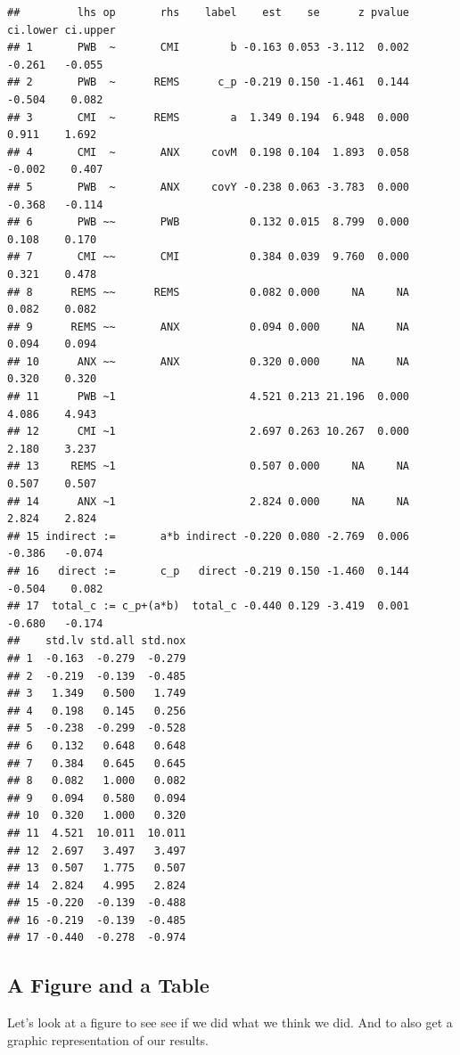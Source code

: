\documentclass[
  11pt,
]{book}
\begin{document}
\begin{verbatim}
##         lhs op       rhs    label    est    se      z pvalue ci.lower ci.upper
## 1       PWB  ~       CMI        b -0.163 0.053 -3.112  0.002   -0.261   -0.055
## 2       PWB  ~      REMS      c_p -0.219 0.150 -1.461  0.144   -0.504    0.082
## 3       CMI  ~      REMS        a  1.349 0.194  6.948  0.000    0.911    1.692
## 4       CMI  ~       ANX     covM  0.198 0.104  1.893  0.058   -0.002    0.407
## 5       PWB  ~       ANX     covY -0.238 0.063 -3.783  0.000   -0.368   -0.114
## 6       PWB ~~       PWB           0.132 0.015  8.799  0.000    0.108    0.170
## 7       CMI ~~       CMI           0.384 0.039  9.760  0.000    0.321    0.478
## 8      REMS ~~      REMS           0.082 0.000     NA     NA    0.082    0.082
## 9      REMS ~~       ANX           0.094 0.000     NA     NA    0.094    0.094
## 10      ANX ~~       ANX           0.320 0.000     NA     NA    0.320    0.320
## 11      PWB ~1                     4.521 0.213 21.196  0.000    4.086    4.943
## 12      CMI ~1                     2.697 0.263 10.267  0.000    2.180    3.237
## 13     REMS ~1                     0.507 0.000     NA     NA    0.507    0.507
## 14      ANX ~1                     2.824 0.000     NA     NA    2.824    2.824
## 15 indirect :=       a*b indirect -0.220 0.080 -2.769  0.006   -0.386   -0.074
## 16   direct :=       c_p   direct -0.219 0.150 -1.460  0.144   -0.504    0.082
## 17  total_c := c_p+(a*b)  total_c -0.440 0.129 -3.419  0.001   -0.680   -0.174
##    std.lv std.all std.nox
## 1  -0.163  -0.279  -0.279
## 2  -0.219  -0.139  -0.485
## 3   1.349   0.500   1.749
## 4   0.198   0.145   0.256
## 5  -0.238  -0.299  -0.528
## 6   0.132   0.648   0.648
## 7   0.384   0.645   0.645
## 8   0.082   1.000   0.082
## 9   0.094   0.580   0.094
## 10  0.320   1.000   0.320
## 11  4.521  10.011  10.011
## 12  2.697   3.497   3.497
## 13  0.507   1.775   0.507
## 14  2.824   4.995   2.824
## 15 -0.220  -0.139  -0.488
## 16 -0.219  -0.139  -0.485
## 17 -0.440  -0.278  -0.974
\end{verbatim}

\hypertarget{a-figure-and-a-table-1}{%
\subsection{A Figure and a Table}\label{a-figure-and-a-table-1}}

Let's look at a figure to see see if we did what we think we did. And to also get a graphic representation of our results.
\end{document}
